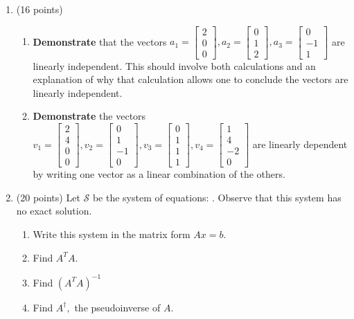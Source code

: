 \documentclass[11pt,fleqn]{article}
\def\vecthree#1#2#3{\begin{bmatrix}#1\\#2\\#3\end{bmatrix}}
\def\vecfour#1#2#3#4{\begin{bmatrix}#1\\#2\\#3\\#4\end{bmatrix}}
\begin{document}
\newpage
\begin{enumerate}

\item (16 points) 
	\begin{enumerate}
	\item \textbf{Demonstrate} that the vectors $a_1=\vecthree{2}{0}{0}, a_2=\vecthree{0}{1}{2}, a_3=\vecthree{0}{-1}{1}$ are linearly independent. This should involve both calculations and an explanation of why that calculation allows one to conclude the vectors are linearly independent. 	
	\vfill
	
	\item \textbf{Demonstrate} the vectors $v_1=\vecfour{2}{4}{0}{0}, v_2=\vecfour{0}{1}{-1}{0}, v_3=\vecfour{0}{1}{1}{1}, v_4=\vecfour{1}{4}{-2}{0}$ are linearly dependent by writing one vector as a linear combination of the others. 
	\vfill

	\end{enumerate}
\newpage
\item (20 points) Let $\mathcal{S}$ be the system of equations: \quad {}. Observe that this system has no exact solution.
	\begin{enumerate}
	\item Write this system in the matrix form $Ax=b.$
	\vfill
	\item Find $A^TA.$
	\vfill
	\item Find $(A^TA)^{-1}$
	\vfill
	\item Find $A^{\dagger},$ the pseudoinverse of $A.$
	\vfill
	

\end{enumerate}
\end{enumerate}
\end{document}
